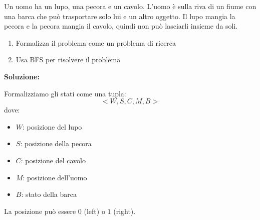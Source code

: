 \documentclass[a4paper]{article}
\begin{document}
\begin{exercise}
  Un uomo ha un lupo, una pecora e un cavolo. L'uomo è sulla riva di un fiume con una
  barca che può trasportare solo lui e un altro oggetto. Il lupo mangia la pecora e la
  pecora mangia il cavolo, quindi non può lasciarli insieme da soli.
  \begin{enumerate}
    \item Formalizza il problema come un problema di ricerca
    \item Usa BFS per risolvere il problema
  \end{enumerate}

  \vspace{1em}
  \noindent
  \textbf{Soluzione:}

  Formalizziamo gli stati come una tupla:
  \[
    <W, S, C, M, B>
  \] 
  dove:
  \begin{itemize}
    \item \( W \): posizione del lupo
    \item \( S \): posizione della pecora
    \item \( C \): posizione del cavolo
    \item \( M \): posizione dell'uomo
    \item \( B \): stato della barca
  \end{itemize}
  La posizione può essere \( 0 \) (left) o \( 1 \) (right).


\end{exercise}
\end{document}
